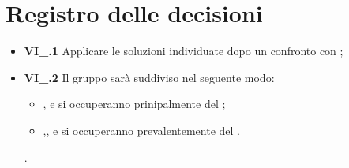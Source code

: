 \section{Registro delle decisioni}
\begin{itemize}
	\item \textbf{VI\_\Data.1} Applicare le soluzioni individuate dopo un confronto con {\Proponente};
	\item \textbf{VI\_\Data.2} Il gruppo sarà suddiviso nel seguente modo:
	\begin{itemize}
		\item {\TL},{\BL} e {\FF} si occuperanno prinipalmente del ;
		\item {\MM},{\PC},{\TG} e {\VD} si occuperanno prevalentemente del .
	\end{itemize}.
\end{itemize}